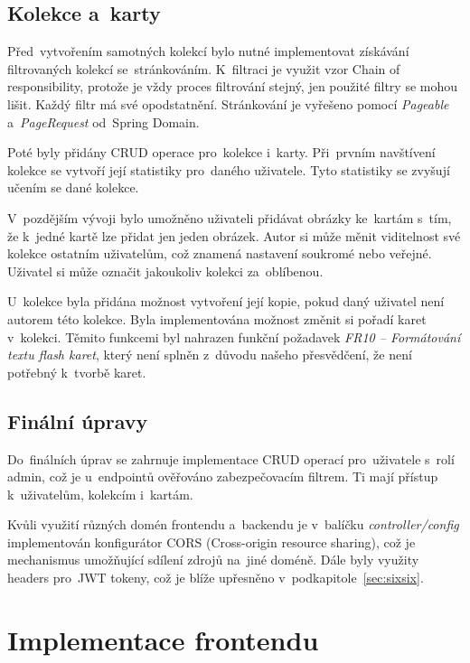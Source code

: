 \documentclass[twoside]{ctuthesis}
\begin{document}
\subsection{Kolekce a~karty}

Před~vytvořením samotných kolekcí bylo nutné implementovat získávání filtrovaných kolekcí se~stránkováním. K~filtraci je využit vzor Chain of responsibility, protože je vždy proces filtrování stejný, jen použité filtry se mohou lišit. Každý filtr má své opodstatnění. Stránkování je vyřešeno pomocí \emph{Pageable} a~\emph{PageRequest} od~Spring Domain.

Poté byly přidány CRUD operace pro~kolekce i~karty. Při~prvním navštívení kolekce se vytvoří její statistiky pro~daného uživatele. Tyto statistiky se zvyšují učením se dané kolekce.

V~pozdějším vývoji bylo umožněno uživateli přidávat obrázky ke~kartám s~tím, že k~jedné kartě lze přidat jen jeden obrázek. Autor si může měnit viditelnost své kolekce ostatním uživatelům, což znamená nastavení soukromé nebo veřejné. Uživatel si může označit jakoukoliv kolekci za~oblíbenou.

\newpage

U~kolekce byla přidána možnost vytvoření její kopie, pokud daný uživatel není autorem této kolekce. Byla implementována možnost změnit si pořadí karet v~kolekci. Těmito funkcemi byl nahrazen funkční požadavek \emph{FR10 -- Formátování textu flash karet}, který není splněn z~důvodu našeho přesvědčení, že není potřebný k~tvorbě karet.

\subsection{Finální úpravy}

Do~finálních úprav se zahrnuje implementace CRUD operací pro~uživatele s~rolí admin, což je u~endpointů ověřováno zabezpečovacím filtrem. Ti mají přístup k~uživatelům, kolekcím i~kartám.

Kvůli využití různých domén frontendu a~backendu je v~balíčku \emph{controller/config} implementován konfigurátor CORS (Cross-origin resource sharing), což je mechanismus umožňující sdílení zdrojů na~jiné doméně. Dále byly využity headers pro~JWT tokeny, což je blíže upřesněno v~podkapitole~\ref{sec:sixsix}.

\section{Implementace frontendu}
\end{document}
